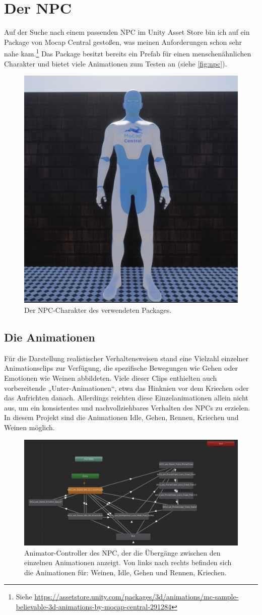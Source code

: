 \documentclass[a4paper]{article}
\begin{document}
\section{Der NPC}
Auf der Suche nach einem passenden NPC im Unity Asset Store bin ich auf ein Package von Mocap Central gestoßen, was meinen Anforderungen schon sehr nahe kam.\footnote{Siehe \url{https://assetstore.unity.com/packages/3d/animations/mc-sample-believable-3d-animations-by-mocap-central-291284}} Das Package besitzt bereits ein Prefab für einen menschenähnlichen Charakter und bietet viele Animationen zum Testen an (siehe \autoref{fig:npc}).
\begin{figure}[h]
	\centering
	\includegraphics[width=.5\textwidth]{img/NPC.png}
	\caption{Der NPC-Charakter des verwendeten Packages.}
	\label{fig:npc}
\end{figure}


\subsection{Die Animationen}
Für die Darstellung realistischer Verhaltensweisen stand eine Vielzahl einzelner Animationsclips zur Verfügung, die spezifische Bewegungen wie Gehen oder Emotionen wie Weinen abbildeten. Viele dieser Clips enthielten auch vorbereitende „Unter-Animationen“, etwa das Hinknien vor dem Kriechen oder das Aufrichten danach. Allerdings reichten diese Einzelanimationen allein nicht aus, um ein konsistentes und nachvollziehbares Verhalten des NPCs zu erzielen. In diesem Projekt sind die Animationen Idle, Gehen, Rennen, Kriechen und Weinen möglich.

\begin{figure}[h]
	\centering
	\includegraphics[width=.7\textwidth]{img/Animatorcontroller.png}
	\caption{Animator-Controller des NPC, der die Übergänge zwischen den einzelnen Animationen anzeigt. Von links nach rechts befinden sich die Animationen für: Weinen, Idle, Gehen und Rennen, Kriechen.}
	\label{fig:animatorcontroller}
\end{figure}
\end{document}
